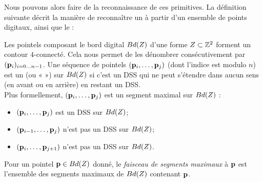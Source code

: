 Nous pouvons alors faire de la reconnaissance de ces primitives. La définition
suivante décrit la manière de reconnaître un  à partir
d'un ensemble de points digitaux, ainsi que le  :
%
\begin{definition}{}
  \label{def:MDSS}
%
  Les pointels composant le bord digital $Bd({Z})$ d'une forme
  $Z \subset \mathbb{Z}^2$ forment un contour $4$-connecté. Cela nous permet de
  les dénombrer consécutivement par $(\mathbf{p}_i)_{i={0\ldots n-1}}$. Une séquence de
  pointels $(\mathbf{p}_i, \ldots, \mathbf{p}_j)$ (dont l'indice est modulo $n$) est un
   (ou «  ») sur $Bd({Z})$ si c'est
  un DSS qui ne peut s'étendre dans aucun sens (en avant ou en arrière) en
  restant un DSS.
  \\
  Plus formellement, $(\mathbf{p}_i, \ldots, \mathbf{p}_j)$ est un segment maximal sur $Bd({Z})$ \ssi :
  \begin{itemize}
    \item $(\mathbf{p}_i, \ldots, \mathbf{p}_j)$ est un DSS sur $Bd({Z})$;
    \item $(\mathbf{p}_{i-1}, \ldots, \mathbf{p}_j)$ n'est pas un DSS sur $Bd({Z})$;
    \item $(\mathbf{p}_i, \ldots, \mathbf{p}_{j+1})$ n'est pas un DSS sur $Bd({Z})$.
  \end{itemize}
  Pour un pointel $\mathbf{p} \in Bd({Z})$ donné, le \emph{faisceau de segments maximaux} à $\mathbf{p}$ est l'ensemble
  des segments maximaux de $Bd({Z})$ contenant $\mathbf{p}$.
%
\end{definition}


